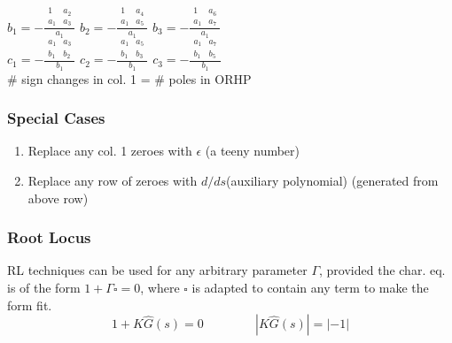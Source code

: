 \documentclass[twocolumn, 12pt]{article}    %
\begin{document}
\begin{center}
\(
b_1 = -\frac{
\begin{array}{|cc|}
    1 & a_2 \\
    a_1 & a_3 
\end{array}} {a_1}
\) 
\hspace{10pt}
\(
b_2= -\frac{
\begin{array}{|cc|}
    1 & a_4 \\
    a_1 & a_5 
\end{array}} {a_1}
\) 
\hspace{10pt}
\(
b_3 = -\frac{
\begin{array}{|cc|}
    1 & a_6 \\
    a_1 & a_7 
\end{array}} {a_1}
\) \\
\vspace{10pt}
\(
c_1 = -\frac{
\begin{array}{|cc|}
    a_1 & a_3 \\
    b_1 & b_2 
\end{array}} {b_1}
\) 
\hspace{10pt}
\(
c_2= -\frac{
\begin{array}{|cc|}
    a_1 & a_5 \\
    b_1 & b_3 
\end{array}} {b_1}
\) 
\hspace{10pt}
\(
c_3 = -\frac{
\begin{array}{|cc|}
    a_1 & a_7 \\
    b_1 & b_5 
\end{array}} {b_1}
\) \\
\vspace{15pt}
\# sign changes in col. 1 = \# poles in ORHP
\end{center}
\subsubsection*{Special Cases}
\begin{enumerate}
    \item Replace any col. 1 zeroes with \(\epsilon\) (a teeny number)
    \item Replace any row of zeroes with \(d/ds\)(auxiliary polynomial) (generated from above row)
\end{enumerate}





\subsubsection*{Root Locus}
    RL techniques can be used for any arbitrary parameter \(\Gamma\), provided the char. eq. is of the form \(1+\Gamma \square =0\), where \(\square\) \hspace{5pt} is adapted to contain any term to make the form fit.
    \begin{equation*}
        1 +K \hat{G}(s) = 0 \hspace{50pt} |K\hat{G}(s)| = |-1|
    \end{equation*}
    
\end{document}
